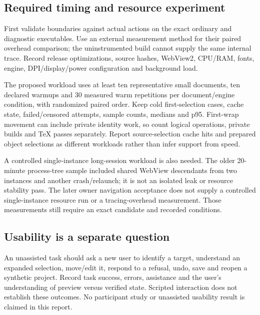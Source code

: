 \subsection{Required timing and resource experiment}
First validate boundaries against actual actions on the exact ordinary and
diagnostic executables. Use an external measurement method for their paired
overhead comparison; the uninstrumented build cannot supply the same internal
trace. Record release optimizations, source hashes, WebView2, CPU/RAM, fonts,
engine, DPI/display/power configuration and background load.

The proposed workload uses at least ten representative small documents, ten
declared warmups and 30 measured warm repetitions per document/engine condition,
with randomized paired order. Keep cold first-selection cases, cache state,
failed/censored attempts, sample counts, medians and p95. First-wrap movement
can include private identity work, so count logical operations, private builds
and TeX passes separately. Report source-selection cache hits and prepared
object selections as different workloads rather than infer support from speed.

A controlled single-instance long-session workload is also needed. The older
20-minute process-tree sample included shared WebView descendants from two
instances and another crash/relaunch; it is not an isolated leak or resource
stability pass. The later owner navigation acceptance does not supply a
controlled single-instance resource run or a tracing-overhead measurement.
Those measurements still require an exact candidate and recorded conditions.

\subsection{Usability is a separate question}
An unassisted task should ask a new user to identify a target, understand an
expanded selection, move/edit it, respond to a refusal, undo, save and reopen a
synthetic project. Record task success, errors, assistance and the user's
understanding of preview versus verified state. Scripted interaction does not
establish these outcomes. No participant study or unassisted usability result
is claimed in this report.
